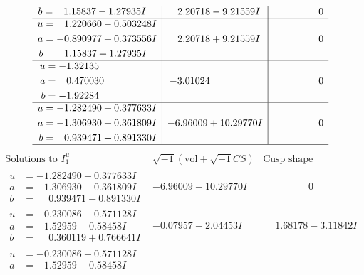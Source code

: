 \documentclass[1p]{elsarticle_modified}
\theoremstyle{definition}
\newcommand{\I}{\sqrt{-1}}
\begin{document}
$$\begin{array}{c|c|c}
\begin{aligned}
b &= \phantom{-}1.15837 - 1.27935 I\end{aligned}
 & \phantom{-}2.20718 - 9.21559 I & \phantom{-0.000000 } 0 \\ \hline\begin{aligned}
u &= \phantom{-}1.220660 - 0.503248 I \\
a &= -0.890977 + 0.373556 I \\
b &= \phantom{-}1.15837 + 1.27935 I\end{aligned}
 & \phantom{-}2.20718 + 9.21559 I & \phantom{-0.000000 } 0 \\ \hline\begin{aligned}
u &= -1.32135\phantom{ +0.000000I} \\
a &= \phantom{-}0.470030\phantom{ +0.000000I} \\
b &= -1.92284\phantom{ +0.000000I}\end{aligned}
 & -3.01024\phantom{ +0.000000I} & \phantom{-0.000000 } 0 \\ \hline\begin{aligned}
u &= -1.282490 + 0.377633 I \\
a &= -1.306930 + 0.361809 I \\
b &= \phantom{-}0.939471 + 0.891330 I\end{aligned}
 & -6.96009 + 10.29770 I & \phantom{-0.000000 } 0\\
 \hline 
 \end{array}$$\newpage$$\begin{array}{c|c|c}  
\text{Solutions to }I^u_{1}& \I (\text{vol} + \sqrt{-1}CS) & \text{Cusp shape}\\
 \hline 
\begin{aligned}
u &= -1.282490 - 0.377633 I \\
a &= -1.306930 - 0.361809 I \\
b &= \phantom{-}0.939471 - 0.891330 I\end{aligned}
 & -6.96009 - 10.29770 I & \phantom{-0.000000 } 0 \\ \hline\begin{aligned}
u &= -0.230086 + 0.571128 I \\
a &= -1.52959 - 0.58458 I \\
b &= \phantom{-}0.360119 + 0.766641 I\end{aligned}
 & -0.07957 + 2.04453 I & \phantom{-}1.68178 - 3.11842 I \\ \hline\begin{aligned}
u &= -0.230086 - 0.571128 I \\
a &= -1.52959 + 0.58458 I \\

\end{aligned}
\end{array}$$
\end{document}

